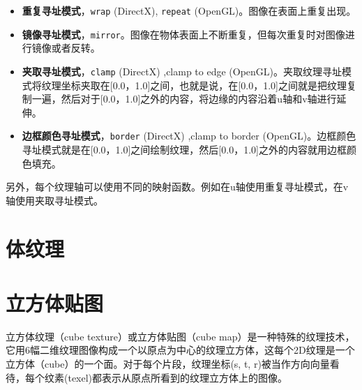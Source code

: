 \documentclass[UTF8,a4paper,12pt]{ctexbook}
\begin{document}
			\begin{itemize}
				\item \textbf{重复寻址模式}，\verb|wrap| (DirectX), \verb|repeat| (OpenGL)。图像在表面上重复出现。
				\item \textbf{镜像寻址模式}，\verb|mirror|。图像在物体表面上不断重复，但每次重复时对图像进行镜像或者反转。
				\item \textbf{夹取寻址模式}，\verb|clamp| (DirectX) ,clamp to edge (OpenGL)。夹取纹理寻址模式将纹理坐标夹取在[0.0，1.0]之间，也就是说，在[0.0，1.0]之间就是把纹理复制一遍，然后对于[0.0，1.0]之外的内容，将边缘的内容沿着u轴和v轴进行延伸。
				\item \textbf{边框颜色寻址模式}，\verb|border| (DirectX) ,clamp to border (OpenGL)。边框颜色寻址模式就是在[0.0，1.0]之间绘制纹理，然后[0.0，1.0]之外的内容就用边框颜色填充。		
			\end{itemize}

		另外，每个纹理轴可以使用不同的映射函数。例如在u轴使用重复寻址模式，在v轴使用夹取寻址模式。
		
	\section{体纹理}
	
	\section{立方体贴图}
		立方体纹理（cube texture）或立方体贴图（cube map）是一种特殊的纹理技术，它用6幅二维纹理图像构成一个以原点为中心的纹理立方体，这每个2D纹理是一个立方体（cube）的一个面。对于每个片段，纹理坐标(s, t, r)被当作方向向量看待，每个纹素(texel)都表示从原点所看到的纹理立方体上的图像。
		
\end{document}
